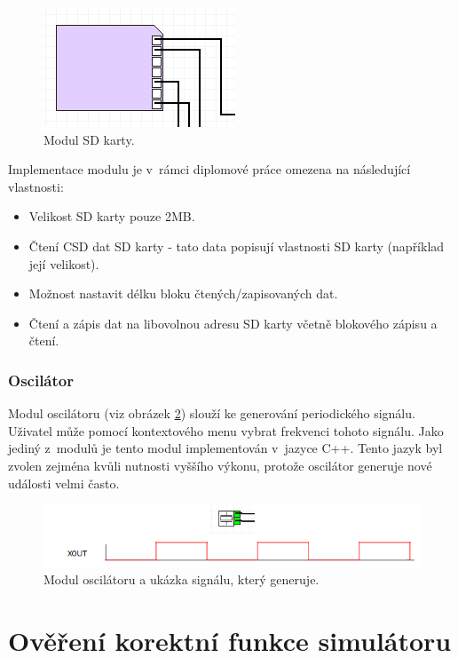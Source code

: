 \begin{figure}[ht]
\centering
\includegraphics[trim=0cm 0cm 0cm 0cm, scale=1]{fig/sd}
\caption{Modul SD karty.}
\label{fig:sd}
\end{figure}

Implementace modulu je v~rámci diplomové práce omezena na následující vlastnosti:

\begin{itemize}
\item Velikost SD karty pouze 2MB.
\item Čtení CSD dat SD karty - tato data popisují vlastnosti SD karty (například její velikost).
\item Možnost nastavit délku bloku čtených/zapisovaných dat.
\item Čtení a zápis dat na libovolnou adresu SD karty včetně blokového zápisu a čtení.
\end{itemize}

\subsection{Oscilátor}

Modul oscilátoru (viz obrázek \ref{fig:oscilator}) slouží ke generování periodického signálu. Uživatel může pomocí kontextového menu vybrat frekvenci tohoto signálu. Jako jediný z~modulů je tento modul implementován v~jazyce C++. Tento jazyk byl zvolen zejména kvůli nutnosti vyššího výkonu, protože oscilátor generuje nové události velmi často.

\begin{figure}[ht]
\centering
\includegraphics[trim=0cm 0cm 0cm 0cm, scale=0.8]{fig/oscilator}
\caption{Modul oscilátoru a ukázka signálu, který generuje.}
\label{fig:oscilator}
\end{figure}

\chapter{Ověření korektní funkce simulátoru}

